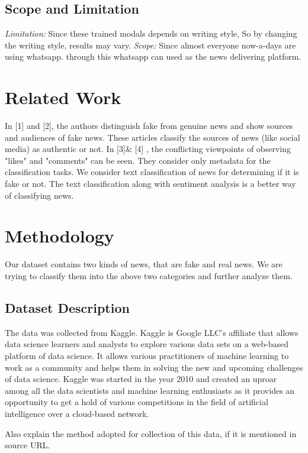 \documentclass[runningheads]{llncs}
\begin{document}
\subsection{Scope and Limitation}
\emph{Limitation:}
Since these trained modals depends on writing style, So by changing the writing style, results may vary.
\newline
\newline
\emph{Scope:}
Since almost everyone now-a-days are using whatsapp. through this whatsapp can used as the news delivering platform.

\section{Related Work}
In [1] and [2], the authors distinguish fake from genuine news and show sources and audiences of fake news. These articles classify the sources of news (like social media) as authentic or not. In [3]& [4] , the conflicting viewpoints of observing "likes" and "comments" can be seen. They consider only metadata for the classification tasks. 
We consider text classification of news for determining if it is fake or not. The text classification along with sentiment analysis is a better way of classifying news.
\section{Methodology}

Our dataset contains two kinds of news, that are fake and real news. We are trying to classify them into the above two categories and further analyze them.


\subsection{Dataset Description}
The data was collected from Kaggle.
Kaggle is Google LLC's affiliate that allows data science learners and analysts to explore various data sets on a web-based platform of data science. It allows various practitioners of machine learning to work as a community and helps them in solving the new and upcoming challenges of data science.
Kaggle was started in the year 2010 and created an uproar among all the data scientists and machine learning enthusiasts as it provides an opportunity to get a hold of various competitions in the field of artificial intelligence over a cloud-based network. 

Also explain the method adopted for collection of this data, if it is mentioned in source URL.
\end{document}
